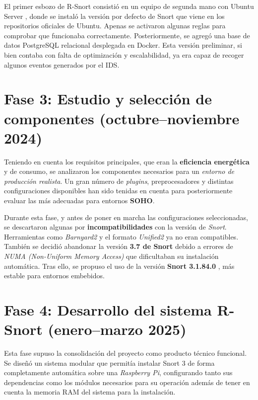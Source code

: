 \documentclass[12pt,a4paper]{report}
\begin{document}
El primer esbozo de R-Snort consistió en un equipo de segunda mano con Ubuntu Server \cite{insani2023implementation}, donde se instaló la versión por defecto de Snort que viene en los repositorios oficiales de Ubuntu. Apenas se activaron algunas reglas para comprobar que funcionaba correctamente. Posteriormente, se agregó una base de datos PostgreSQL relacional \cite{gkamas2022performance} desplegada en Docker. Esta versión preliminar, si bien contaba con falta de optimización y escalabilidad, ya era capaz de recoger algunos eventos generados por el IDS.

\section{Fase 3: Estudio y selección de componentes (octubre–noviembre 2024)}

Teniendo en cuenta los requisitos principales, que eran la \textbf{eficiencia energética} y de consumo, se analizaron los componentes necesarios para un \textit{entorno de producción realista}. Un gran número de \textit{plugins}, preprocesadores y distintas configuraciones disponibles han sido tenidas en cuenta para posteriormente evaluar las más adecuadas para entornos \textbf{SOHO}.\newline

Durante esta fase, y antes de poner en marcha las configuraciones seleccionadas, se descartaron algunas por \textbf{incompatibilidades} con la versión de \textit{Snort}. Herramientas como \textit{Barnyard2} \cite{o2015snort} y el formato \textit{Unified2} ya no eran compatibles. También se decidió abandonar la versión \textbf{3.7 de Snort} debido a errores de \textit{NUMA (Non-Uniform Memory Access)} que dificultaban su instalación automática. Tras ello, se propuso el uso de la versión \textbf{Snort 3.1.84.0} \cite{snort3_3184}, más estable para entornos embebidos.

\section{Fase 4: Desarrollo del sistema R-Snort (enero–marzo 2025)}

Esta fase supuso la consolidación del proyecto como producto técnico funcional. Se diseñó un sistema modular que permitía instalar Snort 3 de forma completamente automática sobre una \textit{Raspberry Pi}, configurando tanto sus dependencias como los módulos necesarios para su operación además de tener en cuenta la memoria RAM del sistema para la instalación.
\end{document}
